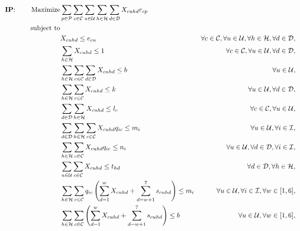 \documentclass[11pt]{article}
\begin{document}
\begin{align}
\text{\textbf{IP}: \;\;\;\;\;\; }\text{Maximize} & \displaystyle
\sum\limits_{p\in \mathcal{P}}
\sum\limits_{c\in \mathcal{C}}
\sum\limits_{u\in \mathcal{U}}
\sum\limits_{h\in \mathcal{H}}
\sum\limits_{d\in \mathcal{D}}
X_{{c}{u}{h}{d}}  r_{{c}{p}} \label{mathmodel_obj}&
\\
\text{subject to} \notag\\
&X_{{c}{u}{h}{d}} \leq e_{{c}{u}}&\forall c \in \mathcal{C}, \forall u \in \mathcal{U}, \forall h \in \mathcal{H}, \forall d \in \mathcal{D}, \label{mathmodel_eligibility}&\\
&\sum\limits_{h\in\mathcal{H}}X_{{c}{u}{h}{d}} \leq 1 &\forall c \in \mathcal{C}, \forall u \in \mathcal{U}, \forall d \in \mathcal{D}, \label{mathmodel_singlechannel}&\\
&\sum\limits_{h\in\mathcal{H}}\sum\limits_{c\in\mathcal{C}}\sum\limits_{d\in\mathcal{D}}X_{{c}{u}{h}{d}} \leq b &\forall u \in \mathcal{U}, \label{mathmodel_percustomercommlimit}&\\
&\sum\limits_{h\in\mathcal{H}}\sum\limits_{c\in\mathcal{C}}X_{{c}{u}{h}{d}} \leq k &\forall u \in \mathcal{U}, \forall d \in \mathcal{D}, \label{mathmodel_percustomercommlimit_day}&\\
&\sum\limits_{d\in\mathcal{D}}\sum\limits_{h\in\mathcal{H}}X_{{c}{u}{h}{d}} \leq l_{c} &\forall c \in \mathcal{C}, \forall u \in \mathcal{U}, \label{mathmodel_percustomercamplimit}&\\
&\sum\limits_{d\in\mathcal{D}}\sum\limits_{h\in\mathcal{H}}\sum\limits_{c\in\mathcal{C}}X_{{c}{u}{h}{d}}  q_{{i}{c}} \leq m_{i} &\forall u \in \mathcal{U}, \forall i \in \mathcal{I}, \label{mathmodel_weeklyquotalimit}&\\
&\sum\limits_{h\in\mathcal{H}}\sum\limits_{c\in\mathcal{C}}X_{{c}{u}{h}{d}}  q_{{i}{c}} \leq n_{i} &\forall u \in \mathcal{U}, \forall d \in \mathcal{D}, \forall i \in \mathcal{I}, \label{mathmodel_dailyquotalimit}&\\
&\sum\limits_{u\in\mathcal{U}}\sum\limits_{c\in\mathcal{C}}X_{{c}{u}{h}{d}} \leq t_{{h}{d}} &\forall d \in \mathcal{D}, \forall h \in \mathcal{H}, \label{mathmodel_channellimit}&\\
&\sum\limits_{h\in\mathcal{H}}\sum\limits_{c\in\mathcal{C}}q_{{i}{c}}\left(\sum_{d=1}^{w}X_{{c}{u}{h}{d}} + \sum_{d=w+1}^{7}s_{{c}{u}{h}{d}}\right) \leq m_{i} &\forall u \in \mathcal{U}, \forall i \in \mathcal{I}, \forall w \in [1,6], \label{mathmodel_weeklyquotalimit_rh}&\\
&\sum\limits_{h\in\mathcal{H}}\sum\limits_{c\in\mathcal{C}}\left(\sum_{d=1}^{w}X_{{c}{u}{h}{d}} + \sum_{d=w+1}^{7}s_{{c}{u}{h}{d}}\right) \leq b &\forall u \in \mathcal{U}, \forall w \in [1,6], \label{mathmodel_percustomercommlimit_rh}&\\

\end{align}
\end{document}
